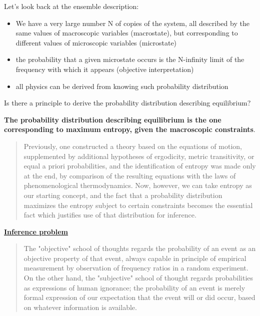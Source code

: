 
Let’s look back at the ensemble description:
\begin{itemize}
    \item We have a very large number N of copies of the system, all described by the same values of macroscopic variables (macrostate), but corresponding to different values of microscopic variables (microstate)
    \item the probability that a given microstate occurs is the N-infinity limit of the frequency with which it appears (objective interpretation)
    \item all physics can be derived from knowing such probability distribution
\end{itemize}

Is there a principle to derive the probability distribution describing equilibrium?

\textbf{The probability distribution describing equilibrium is the one corresponding to maximum entropy, given the macroscopic constraints}.\\


\begin{quote}
    Previously, one constructed a theory based on the equations of motion, supplemented by additional hypotheses of ergodicity, metric transitivity, or equal a priori probabilities, and the identification of entropy was made only at the end, by comparison of the resulting equations with the laws of phenomenological thermodynamics. Now, however, we can take entropy as our starting concept, and the fact that a probability distribution maximizes the entropy subject to certain constraints becomes the essential fact which justifies use of that distribution for inference.\\
\end{quote}

\underline{\textbf{Inference problem}}
\begin{quote}
    The "objective" school of thoughts regards the probability of an event as an objective property of that event, always capable in principle of empirical measurement by observation of frequency ratios in a random experiment.\\
    On the other hand, the "subjective" school of thought regards probabilities as expressions of human ignorance; the probability of an event is merely formal expression of our expectation that the event will or did occur, based on whatever information is available.
\end{quote}

